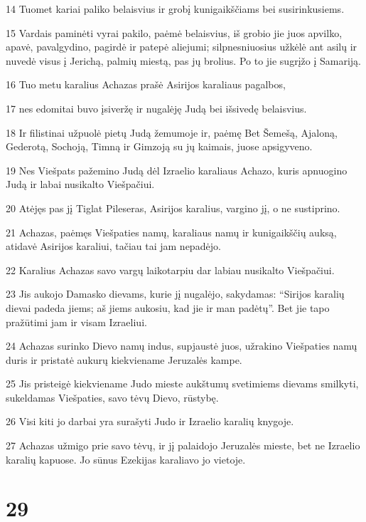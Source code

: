 \par 14 Tuomet kariai paliko belaisvius ir grobį kunigaikščiams bei susirinkusiems. 
\par 15 Vardais paminėti vyrai pakilo, paėmė belaisvius, iš grobio jie juos apvilko, apavė, pavalgydino, pagirdė ir patepė aliejumi; silpnesniuosius užkėlė ant asilų ir nuvedė visus į Jerichą, palmių miestą, pas jų brolius. Po to jie sugrįžo į Samariją. 
\par 16 Tuo metu karalius Achazas prašė Asirijos karaliaus pagalbos, 
\par 17 nes edomitai buvo įsiveržę ir nugalėję Judą bei išsivedę belaisvius. 
\par 18 Ir filistinai užpuolė pietų Judą žemumoje ir, paėmę Bet Šemešą, Ajaloną, Gederotą, Sochoją, Timną ir Gimzoją su jų kaimais, juose apsigyveno. 
\par 19 Nes Viešpats pažemino Judą dėl Izraelio karaliaus Achazo, kuris apnuogino Judą ir labai nusikalto Viešpačiui. 
\par 20 Atėjęs pas jį Tiglat Pileseras, Asirijos karalius, vargino jį, o ne sustiprino. 
\par 21 Achazas, paėmęs Viešpaties namų, karaliaus namų ir kunigaikščių auksą, atidavė Asirijos karaliui, tačiau tai jam nepadėjo. 
\par 22 Karalius Achazas savo vargų laikotarpiu dar labiau nusikalto Viešpačiui. 
\par 23 Jis aukojo Damasko dievams, kurie jį nugalėjo, sakydamas: “Sirijos karalių dievai padeda jiems; aš jiems aukosiu, kad jie ir man padėtų”. Bet jie tapo pražūtimi jam ir visam Izraeliui. 
\par 24 Achazas surinko Dievo namų indus, supjaustė juos, užrakino Viešpaties namų duris ir pristatė aukurų kiekviename Jeruzalės kampe. 
\par 25 Jis pristeigė kiekviename Judo mieste aukštumų svetimiems dievams smilkyti, sukeldamas Viešpaties, savo tėvų Dievo, rūstybę. 
\par 26 Visi kiti jo darbai yra surašyti Judo ir Izraelio karalių knygoje. 
\par 27 Achazas užmigo prie savo tėvų, ir jį palaidojo Jeruzalės mieste, bet ne Izraelio karalių kapuose. Jo sūnus Ezekijas karaliavo jo vietoje.



\chapter{29}

